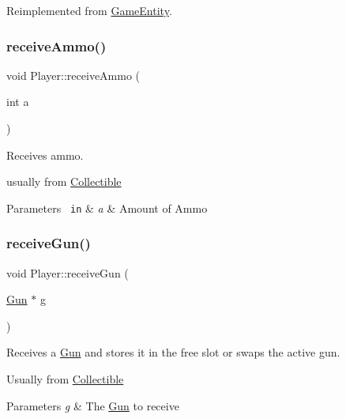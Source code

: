 Reimplemented from \mbox{\hyperlink{class_game_entity_ae8417c4fa668594827706c44091f7366}{Game\+Entity}}.

\mbox{\label{class_player_a1d6d1ea006e3d30cab6ccdf2392e5725}} 
\subsubsection{\texorpdfstring{receiveAmmo()}{receiveAmmo()}}
{\footnotesize\ttfamily void Player\+::receive\+Ammo (\begin{DoxyParamCaption}\item[{int}]{a }\end{DoxyParamCaption})}



Receives ammo. 

usually from \mbox{\hyperlink{class_collectible}{Collectible}}


\begin{DoxyParams}[1]{Parameters}
\mbox{\texttt{ in}}  & {\em a} & Amount of Ammo \\
\hline
\end{DoxyParams}
\mbox{\label{class_player_adf6426172aadb1a138a84f1323ecdae6}} 
\subsubsection{\texorpdfstring{receiveGun()}{receiveGun()}}
{\footnotesize\ttfamily void Player\+::receive\+Gun (\begin{DoxyParamCaption}\item[{\mbox{\hyperlink{class_gun}{Gun}} $\ast$}]{g }\end{DoxyParamCaption})}



Receives a \mbox{\hyperlink{class_gun}{Gun}} and stores it in the free slot or swaps the active gun. 

Usually from \mbox{\hyperlink{class_collectible}{Collectible}}


\begin{DoxyParams}{Parameters}
{\em g} & The \mbox{\hyperlink{class_gun}{Gun}} to receive \\
\hline
\end{DoxyParams}
\mbox{\label{class_player_aaa002a0d70ccd8bbd6286f7d95b223a6}} 
